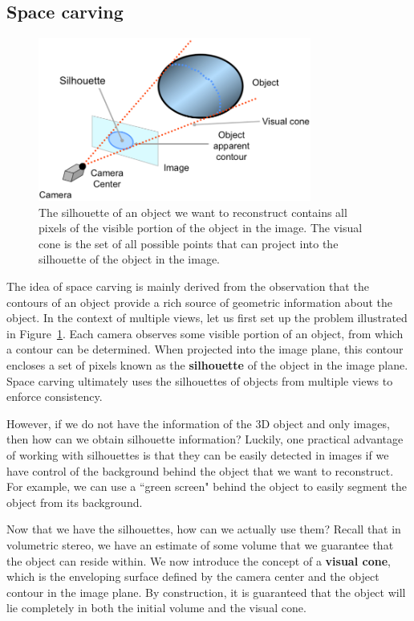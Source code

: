 \documentclass[a4paper, 12pt]{article}
\renewcommand\emph{\textbf}
\numberwithin{equation}{section}
\begin{document}
\subsection{Space carving}
\begin{figure}[h!]
    \centering
    \includegraphics[width = 0.8\textwidth]{figures/visual_cone.png}
    \caption{The silhouette of an object we want to reconstruct contains all pixels of the visible portion of the object in the image. The visual cone is the set of all possible points that can project into the silhouette of the object in the image.}
    \label{fig:visual_cone}
\end{figure}
The idea of space carving is mainly derived from the observation that the contours of an object provide a rich source of geometric information about the object. In the context of multiple views, let us first set up the problem illustrated in Figure~\ref{fig:visual_cone}. Each camera observes some visible portion of an object, from which a contour can be determined. When projected into the image plane, this contour encloses a set of pixels known as the \emph{silhouette} of the object in the image plane. Space carving ultimately uses the silhouettes of objects from multiple views to enforce consistency.

However, if we do not have the information of the 3D object and only images, then how can we obtain silhouette information? Luckily, one practical advantage of working with silhouettes is that they can be easily detected in images if we have control of the background behind the object that we want to reconstruct. For example, we can use a ``green screen" behind the object to easily segment the object from its background.

Now that we have the silhouettes, how can we actually use them? Recall that in volumetric stereo, we have an estimate of some volume that we guarantee that the object can reside within. We now introduce the concept of a \emph{visual cone}, which is the enveloping surface defined by the camera center and the object contour in the image plane. By construction, it is guaranteed that the object will lie completely in both the initial volume and the visual cone. 
\end{document}
